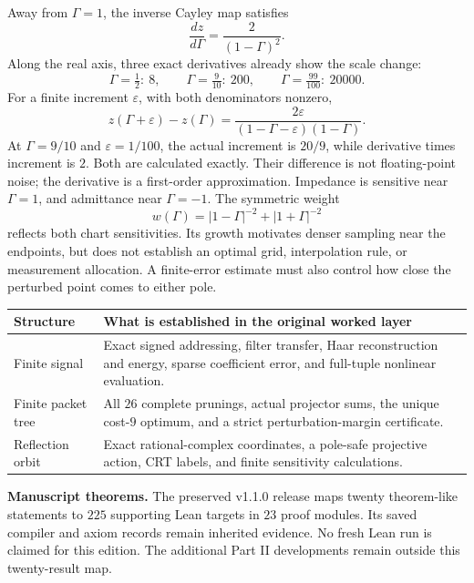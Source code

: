 Away from $\Gamma=1$, the inverse Cayley map satisfies
\[
\frac{dz}{d\Gamma}=\frac2{(1-\Gamma)^2}.
\]
Along the real axis, three exact derivatives already show the scale change:
\[
\Gamma=\tfrac12:\ 8,\qquad
\Gamma=\tfrac9{10}:\ 200,\qquad
\Gamma=\tfrac{99}{100}:\ 20000.
\]
For a finite increment $\varepsilon$, with both denominators nonzero,
\[
z(\Gamma+\varepsilon)-z(\Gamma)
=\frac{2\varepsilon}{(1-\Gamma-\varepsilon)(1-\Gamma)}.
\]
At $\Gamma=9/10$ and $\varepsilon=1/100$, the actual increment is $20/9$, while derivative times increment is $2$. Both are calculated exactly. Their difference is not floating-point noise; the derivative is a first-order approximation.
Impedance is sensitive near $\Gamma=1$, and admittance near $\Gamma=-1$. The symmetric weight
\[
w(\Gamma)=|1-\Gamma|^{-2}+|1+\Gamma|^{-2}
\]
reflects both chart sensitivities. Its growth motivates denser sampling near the endpoints, but does not establish an optimal grid, interpolation rule, or measurement allocation. A finite-error estimate must also control how close the perturbed point comes to either pole.

\begin{tabularx}{\linewidth}{@{}p{.24\linewidth}X@{}}
\toprule
Structure & What is established in the original worked layer\\\midrule
Finite signal & Exact signed addressing, filter transfer, Haar reconstruction and energy, sparse coefficient error, and full-tuple nonlinear evaluation.\\
Finite packet tree & All $26$ complete prunings, actual projector sums, the unique cost-$9$ optimum, and a strict perturbation-margin certificate.\\
Reflection orbit & Exact rational-complex coordinates, a pole-safe projective action, CRT labels, and finite sensitivity calculations.\\\bottomrule
\end{tabularx}
\textbf{Manuscript theorems.} The preserved v1.1.0 release maps twenty theorem-like statements to $225$ supporting Lean targets in $23$ proof modules. Its saved compiler and axiom records remain inherited evidence. No fresh Lean run is claimed for this edition. The additional Part II developments remain outside this twenty-result map.

